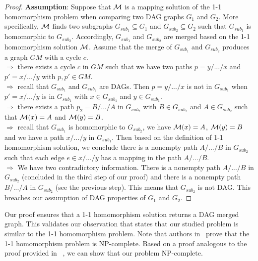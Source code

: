 \begin{proof}
\label{pr:DAG-homo}
\textbf{Assumption}: 
Suppose that ${\mathcal M}$ is a mapping solution of the 1-1 homomorphism problem when comparing two DAG graphs $G_1$ and $G_2$.
More specifically, ${\mathcal M}$ finds two subgraphs $G_{sub_1} \subseteq G_1$ and $G_{sub_2} \subseteq G_2$ such that $G_{sub_1}$  is homomorphic to $G_{sub_2}$.
Accordingly, $G_{sub_1}$  and $G_{sub_2}$ are merged based on the 1-1 homomorphism solution ${\mathcal M}$. Assume that the merge of $G_{sub_1}$  and $G_{sub_2}$ produces a graph $GM$ with a cycle $c$.\\
$\Longrightarrow $ there exists a cycle $c$ in $GM$ such that we have two paths $p=y/.../x$  and $p'=x/.../y$ with $p,p' \in GM$.\\
$\Longrightarrow $ recall that $G_{sub_1}$ and $G_{sub_2}$ are DAGs. Then $p=y/.../x$ is not in $G_{sub_1}$ when $p'=x/.../y$ is in $G_{sub_1}$ with $x \in G_{sub_1}$ and $y \in G_{sub_1}$.\\
$\Longrightarrow $ there exists a path $p_2=B/.../A$ in $G_{sub_2}$ with $B \in G_{sub_2}$ and $A \in G_{sub_2}$ such that ${\mathcal M}(x)=A$ and ${\mathcal M}(y)=B$. \\
$\Longrightarrow $ recall that $G_{sub_1}$  is homomorphic to $G_{sub_2}$, we have ${\mathcal M}(x)=A$, ${\mathcal M}(y)=B$ and we have a path $x/.../y$ in $G_{sub_{1}}$.
Then based on the definition of 1-1 homomorphism solution, we conclude there is a nonempty path $A/.../B$ in $G_{sub_2}$ such that each edge $e \in x/.../y$ has a mapping in the path $A/.../B$.\\
$\Longrightarrow $ We have two contradictory information. There is a nonempty path $A/.../B$ in $G_{sub_2}$ (concluded in the third step of our proof) and there is a nonempty path $B/.../A$ in $G_{sub_2}$ (see the previous step). This means that $G_{sub_2}$ is not DAG.
This breaches our assumption of DAG properties of $G_1$ and $G_2$.
\end{proof}


Our proof ensures that a 1-1 homomorphism solution returns a DAG merged graph. This validates our observation that states that our studied problem is similar to the 1-1 homomorphism problem. Note that authors in~\cite{Fan:2010:GHR} prove that the 1-1 homomorphism problem is NP-complete. Based on a proof analogous to the proof provided in~\cite{Fan:2010:GHR} , we can show that our problem NP-complete.







